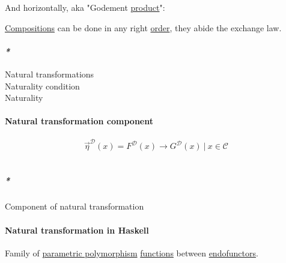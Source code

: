 \documentclass[11pt]{article}
\begin{document}

And horizontally, aka "Godement \hyperref[orga3d1454]{product}":\\



\hyperref[org0500389]{Compositions} can be done in any right \hyperref[org8544276]{order}, they abide the exchange law.\\

\paragraph{\emph{*}}
\label{sec:orgf0092f5}

\label{org740b530}Natural transformations\\
\label{org43e4e9e}Naturality condition\\
\label{org432df37}Naturality\\

\paragraph{\label{org8ce8d85}Natural transformation component}
\label{sec:orgdbdbd00}
$$ \overrightarrow{\eta}^{\mathcal{D}}(x) = F^{\mathcal{D}}(x) \to G^{\mathcal{D}}(x) \ | \  x \in \mathcal{C} $$\\

\subparagraph{\emph{*}}
\label{sec:orgd7a16cf}

\label{org7e4f525}Component of natural transformation\\

\paragraph{\label{org5f09325}Natural transformation in Haskell}
\label{sec:org1b64752}
Family of \hyperref[org9b7bee7]{parametric polymorphism} \hyperref[org66c5288]{functions} between \hyperref[org1a8cedf]{endofunctors}.\\
\end{document}
